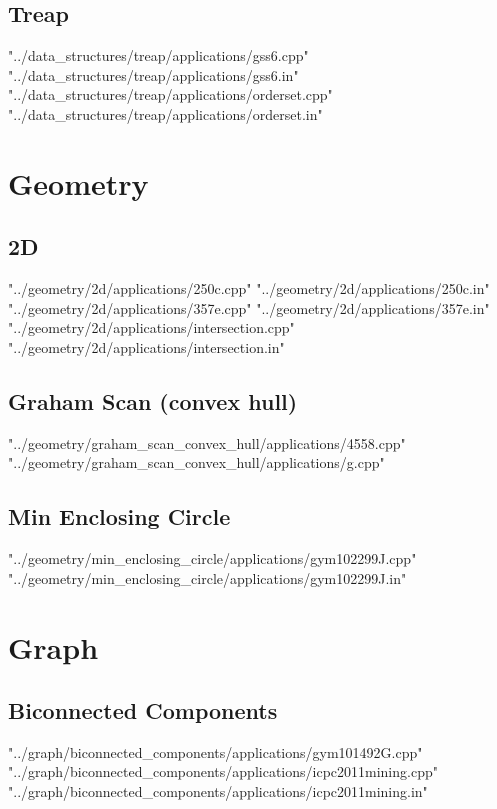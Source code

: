 \documentclass [12pt,onecolumn,oneside]{article}
\begin{document}
\subsection{ Treap}
 {"../data_structures/treap/applications/gss6.cpp"}
 {"../data_structures/treap/applications/gss6.in"}
 {"../data_structures/treap/applications/orderset.cpp"}
 {"../data_structures/treap/applications/orderset.in"}

\newpage

\section{Geometry}
\subsection{ 2D}
 {"../geometry/2d/applications/250c.cpp"}
 {"../geometry/2d/applications/250c.in"}
 {"../geometry/2d/applications/357e.cpp"}
 {"../geometry/2d/applications/357e.in"}
 {"../geometry/2d/applications/intersection.cpp"}
 {"../geometry/2d/applications/intersection.in"}
\subsection{ Graham Scan (convex hull)}
 {"../geometry/graham_scan_convex_hull/applications/4558.cpp"}
 {"../geometry/graham_scan_convex_hull/applications/g.cpp"}
\subsection{ Min Enclosing Circle}
 {"../geometry/min_enclosing_circle/applications/gym102299J.cpp"}
 {"../geometry/min_enclosing_circle/applications/gym102299J.in"}
\newpage

\section{Graph}
\subsection{ Biconnected Components}
 {"../graph/biconnected_components/applications/gym101492G.cpp"}
 {"../graph/biconnected_components/applications/icpc2011mining.cpp"}
 {"../graph/biconnected_components/applications/icpc2011mining.in"}
\end{document}
